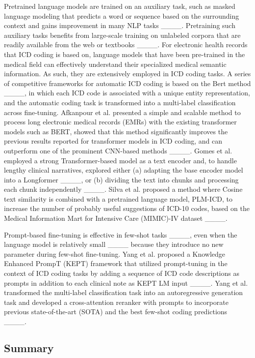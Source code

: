 Pretrained language models are trained on an auxiliary task, such as masked language modeling that predicts a word or sequence based on the surrounding context and gains improvement in many NLP tasks ____. Pretraining such auxiliary tasks benefits from large-scale training on unlabeled corpora that are readily available from the web or textbooks ____. For electronic health records that ICD coding is based on, language models that have been pre-trained in the medical field can effectively understand their specialized medical semantic information. As such, they are extensively employed in ICD coding tasks. A series of competitive frameworks for automatic ICD coding is based on the Bert method ____, in which each ICD code is associated with a unique entity representation, and the automatic coding task is transformed into a multi-label classification across fine-tuning. Afkanpour et al. presented a simple and scalable method to process long electronic medical records (EMRs) with the existing transformer models such as BERT, showed that this method significantly improves the previous results reported for transformer models in ICD coding, and can outperform one of the prominent CNN-based methods ____. Gomes et al. employed a strong Transformer-based model as a text encoder and, to handle lengthy clinical narratives, explored either (a) adapting the base encoder model into a Longformer ____, or (b) dividing the text into chunks and processing each chunk independently ____. Silva et al. proposed a method where Cosine text similarity is combined with a pretrained language model, PLM-ICD, to increase the number of probably useful suggestions of ICD-10 codes, based on the Medical Information Mart for Intensive Care (MIMIC)-IV dataset ____. 

Prompt-based fine-tuning is effective in few-shot tasks ____, even when the language model is relatively small ____ because they introduce no new parameter during few-shot fine-tuning. Yang et al. proposed a Knowledge Enhanced PrompT (KEPT) framework that utilized prompt-tuning in the context of ICD coding tasks by adding a sequence of ICD code descriptions as prompts in addition to each clinical note as KEPT LM input ____. Yang et al. transformed the multi-label classification task into an autoregressive generation task and developed a cross-attention reranker with prompts to incorporate previous state-of-the-art (SOTA) and the best few-shot coding predictions ____. 
 
\subsection{Summary}

